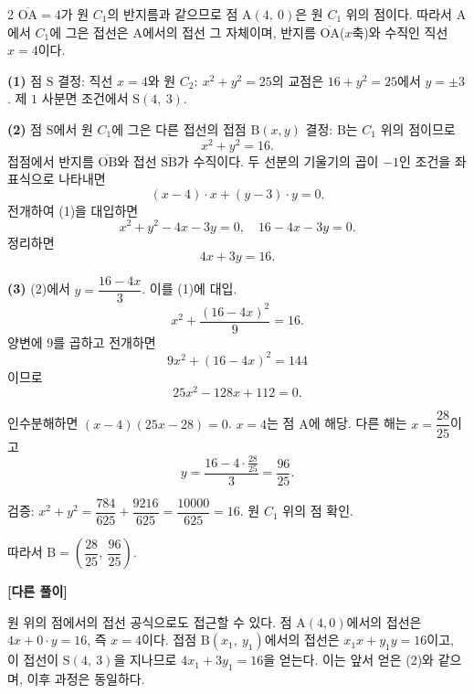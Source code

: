 \documentclass[10pt,fleqn]{article}
\renewcommand{\solpart}[1]{%
  \par\addvspace{10pt}\noindent
  {\sffamily\bfseries\color{black}(#1)}\hspace{3mm}\ignorespaces%
}
\newcommand{\solalt}{%
  \par\addvspace{8pt}\noindent
  \textcolor{gjAltGray}{\sffamily\bfseries [다른 풀이]}\quad\ignorespaces%
}
\begin{document}
\begin{multicols}{2}
$\overline{\mathrm{OA}} = 4$가 원 $C_{1}$의 반지름과 같으므로 점 $\mathrm{A}(4,\ 0)$은 원 $C_{1}$ 위의 점이다. 따라서 $\mathrm{A}$에서 $C_{1}$에 그은 접선은 $\mathrm{A}$에서의 접선 그 자체이며, 반지름 $\overline{\mathrm{OA}}$($x$축)와 수직인 직선 $x = 4$이다.

\solpart{1} 점 $\mathrm{S}$ 결정: 직선 $x = 4$와 원 $C_{2}:\ x^{2} + y^{2} = 25$의 교점은 $16 + y^{2} = 25$에서 $y = \pm 3$. 제 $1$ 사분면 조건에서 $\mathrm{S}(4,\ 3)$.

\solpart{2} 점 $\mathrm{S}$에서 원 $C_{1}$에 그은 다른 접선의 접점 $\mathrm{B}(x, y)$ 결정: $\mathrm{B}$는 $C_{1}$ 위의 점이므로
\[ x^{2} + y^{2} = 16. \tag{1} \]
접점에서 반지름 $\overline{\mathrm{OB}}$와 접선 $\overline{\mathrm{SB}}$가 수직이다. 두 선분의 기울기의 곱이 $-1$인 조건을 좌표식으로 나타내면
\[ (x - 4) \cdot x + (y - 3) \cdot y = 0. \]
전개하여 (1)을 대입하면
\[ x^{2} + y^{2} - 4x - 3y = 0,\quad 16 - 4x - 3y = 0. \]
정리하면
\[ 4x + 3y = 16. \tag{2} \]

\solpart{3} (2)에서 $y = \dfrac{16 - 4x}{3}$. 이를 (1)에 대입.
\[ x^{2} + \dfrac{(16 - 4x)^{2}}{9} = 16. \]
양변에 $9$를 곱하고 전개하면
\[ 9x^{2} + (16 - 4x)^{2} = 144 \]
이므로
\[ 25x^{2} - 128x + 112 = 0. \]

인수분해하면 $(x - 4)(25x - 28) = 0$. $x = 4$는 점 $\mathrm{A}$에 해당. 다른 해는 $x = \dfrac{28}{25}$이고
\[ y = \dfrac{16 - 4 \cdot \tfrac{28}{25}}{3} = \dfrac{96}{25}. \]

검증: $x^{2} + y^{2} = \dfrac{784}{625} + \dfrac{9216}{625} = \dfrac{10000}{625} = 16$. 원 $C_{1}$ 위의 점 확인.

따라서 $\mathrm{B} = \left(\dfrac{28}{25},\ \dfrac{96}{25}\right)$.

\solalt
원 위의 점에서의 접선 공식으로도 접근할 수 있다. 점 $\mathrm{A}(4, 0)$에서의 접선은 $4x + 0 \cdot y = 16$, 즉 $x = 4$이다. 접점 $\mathrm{B}(x_{1},\ y_{1})$에서의 접선은 $x_{1} x + y_{1} y = 16$이고, 이 접선이 $\mathrm{S}(4,\ 3)$을 지나므로 $4 x_{1} + 3 y_{1} = 16$을 얻는다. 이는 앞서 얻은 (2)와 같으며, 이후 과정은 동일하다.



\end{multicols}
\end{document}
